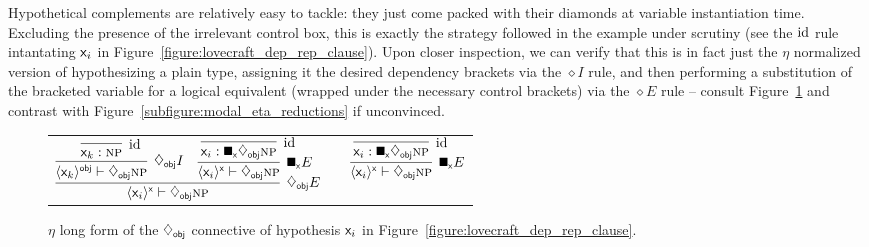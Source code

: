 Hypothetical complements are relatively easy to tackle: they just come packed with their diamonds at variable instantiation time.
Excluding the presence of the irrelevant control box, this is exactly the strategy followed in the example under scrutiny (see the $\mathrm{id}$ rule intantating $\mathsf{x}_{\mathnormal{i}}$ in Figure~\ref{figure:lovecraft_dep_rep_clause}).
Upon closer inspection, we can verify that this is in fact just the $\eta$ normalized version of hypothesizing a plain type, assigning it the desired dependency brackets via the $\diamond I$ rule, and then performing a substitution of the bracketed variable for a logical equivalent (wrapped under the necessary control brackets) via the $\diamond E$ rule -- consult Figure~\ref{figure:eta_normalized_complement_hypothesis} and contrast with Figure~\ref{subfigure:modal_eta_reductions} if unconvinced.

\begin{figure}
	\begin{tabularx}{0.9\textwidth}{@{}cCc@{}}
	$
		\infer[\ddia{obj} E]{\dbra{\vari}{x} \vdash \ddia{obj}\np}{
			\infer[\ddia{obj} I]{\dbra{\vark}{obj} \vdash \ddia{obj}\np}{
				\infer[\Ax]{\vark : \np}{}
			}
			&
			\infer[\dxbox{x} E]{\dbra{\vari}{x} \vdash \ddia{obj}\np}{
				\infer[\Ax]{\vari : \dxbox{x}\ddia{obj}\np}{}
			}
		}
	$
	&
	\raisebox{10pt}{$\overset{\eta}{\equiv}$}
	&
	$
		\infer[\dxbox{x} E]{\dbra{\vari}{x} \vdash \ddia{obj} \np}{\infer[\Ax]{\vari : \dxbox{x}\ddia{obj}\np}{}}
	$
	\end{tabularx}
	\caption{$\eta$ long form of the $\ddia{obj}$ connective of hypothesis $\mathsf{x}_{\mathnormal{i}}$  in Figure~\ref{figure:lovecraft_dep_rep_clause}.}
	\label{figure:eta_normalized_complement_hypothesis}
\end{figure}

